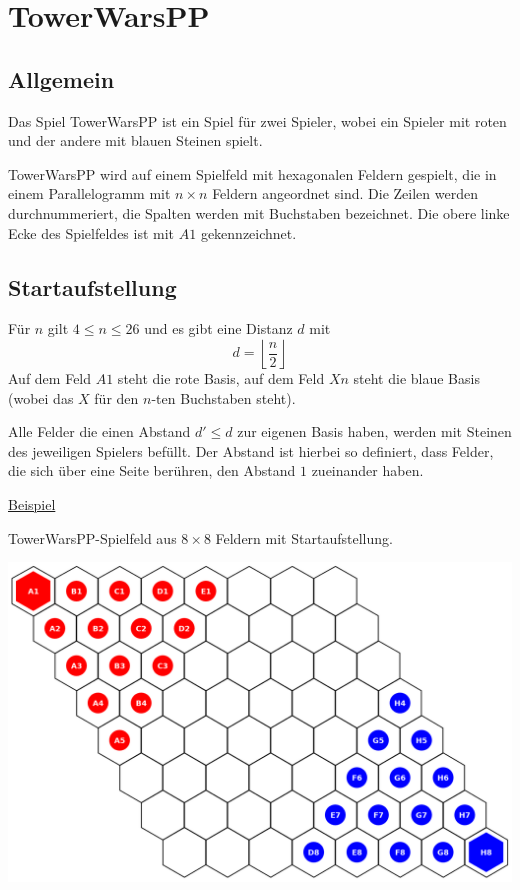 \section*{TowerWarsPP}
\newcommand{\myAlph}[1]{\char\numexpr`A-1+#1\relax}
\newcommand{\myalph}[1]{\char\numexpr`a-1+#1\relax}

\subsection*{Allgemein}
Das Spiel TowerWarsPP ist ein Spiel für zwei Spieler, wobei ein Spieler mit roten und der andere mit blauen Steinen spielt.

TowerWarsPP wird auf einem Spielfeld mit hexagonalen Feldern gespielt, die in einem Parallelogramm mit $n \times n$ Feldern angeordnet sind. Die Zeilen werden durchnummeriert, die Spalten werden mit Buchstaben bezeichnet. Die obere linke Ecke des Spielfeldes ist mit $A1$ gekennzeichnet.

\subsection*{Startaufstellung}
Für $n$ gilt $4 \le n \le 26$ und es gibt eine Distanz $d$ mit \[d = \left\lfloor \frac{n}{2}\right\rfloor\] Auf dem Feld $A1$ steht die rote Basis, auf dem Feld $Xn$ steht die blaue Basis (wobei das $X$ für den $n$-ten Buchstaben steht). 

Alle Felder die einen Abstand $d' \le d$ zur eigenen Basis haben, werden mit Steinen des jeweiligen Spielers befüllt. Der Abstand ist hierbei so definiert, dass Felder, die sich über eine Seite berühren, den Abstand $1$ zueinander haben.

\underline{Beispiel}

TowerWarsPP-Spielfeld aus $8 \times 8$ Feldern mit Startaufstellung.
\begin{center}
\includegraphics[scale=0.25]{graphic/start8.png}
\end{center}

